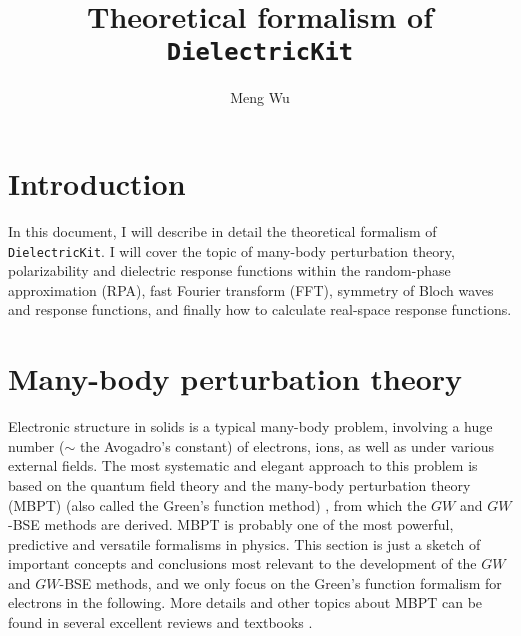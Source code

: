 \documentclass[11pt, oneside]{article}          %
\title{Theoretical formalism of {\tt DielectricKit}}
\author{Meng Wu}
\date{}                                                 %
\begin{document}
\maketitle
\tableofcontents

\section{Introduction}
\label{sec:introduction}

In this document, I will describe in detail the theoretical formalism of {\tt DielectricKit}. I will cover the topic of many-body perturbation theory, polarizability and dielectric response functions within the random-phase approximation (RPA), fast Fourier transform (FFT), symmetry of Bloch waves and response functions, and finally how to calculate real-space response functions.

\section{Many-body perturbation theory}
\label{sec:many-body-pert}

Electronic structure in solids is a typical many-body problem, involving a huge number ($\sim$ the Avogadro's constant) of electrons, ions, as well as under various external fields. The most systematic and elegant approach to this problem is based on the quantum field theory and the many-body perturbation theory (MBPT) (also called the Green's function method) \cite{hedin1965new, schwinger1951green, baym1961field, hedin1970effects}, from which the $GW$ and $GW$-BSE methods are derived. MBPT is probably one of the most powerful, predictive and versatile formalisms in physics. This section is just a sketch of important concepts and conclusions most relevant to the development of the $GW$ and $GW$-BSE methods, and we only focus on the Green's function formalism for electrons in the following. More details and other topics about MBPT can be found in several excellent reviews and textbooks \cite{hedin1970effects, fetter2012quantum, mahan2013many, nozieres1997theory, stefanucci2013nonequilibrium}.
\end{document}
